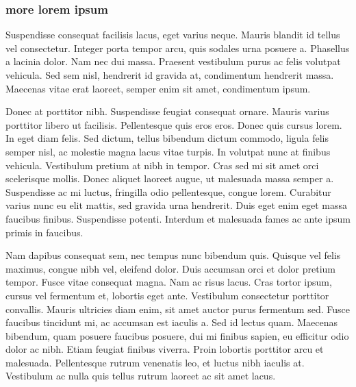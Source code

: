 \documentclass[english]{jamk-report}
\begin{document}
\subsubsection{more lorem ipsum}

Suspendisse consequat facilisis lacus, eget varius neque. Mauris blandit id
tellus vel consectetur. Integer porta tempor arcu, quis sodales urna posuere a.
Phasellus a lacinia dolor. Nam nec dui massa. Praesent vestibulum purus ac
felis volutpat vehicula. Sed sem nisl, hendrerit id gravida at, condimentum
hendrerit massa.  Maecenas vitae erat laoreet, semper enim sit amet,
condimentum ipsum.

Donec at porttitor nibh. Suspendisse feugiat consequat ornare.  Mauris varius
porttitor libero ut facilisis. Pellentesque quis eros eros. Donec quis cursus
lorem. In eget diam felis. Sed dictum, tellus bibendum dictum commodo, ligula
felis semper nisl, ac molestie magna lacus vitae turpis. In volutpat nunc at
finibus vehicula. Vestibulum pretium at nibh in tempor. Cras sed mi sit amet
orci scelerisque mollis. Donec aliquet laoreet augue, ut malesuada massa semper
a. Suspendisse ac mi luctus, fringilla odio pellentesque, congue lorem.
Curabitur varius nunc eu elit mattis, sed gravida urna hendrerit. Duis eget
enim eget massa faucibus finibus. Suspendisse potenti. Interdum et malesuada
fames ac ante ipsum primis in faucibus.

Nam dapibus consequat sem, nec tempus nunc bibendum quis. Quisque vel felis
maximus, congue nibh vel, eleifend dolor. Duis accumsan orci et dolor pretium
tempor. Fusce vitae consequat magna. Nam ac risus lacus. Cras tortor ipsum,
cursus vel fermentum et, lobortis eget ante. Vestibulum consectetur porttitor
convallis. Mauris ultricies diam enim, sit amet auctor purus fermentum sed.
Fusce faucibus tincidunt mi, ac accumsan est iaculis a. Sed id lectus quam.
Maecenas bibendum, quam posuere faucibus posuere, dui mi finibus sapien, eu
efficitur odio dolor ac nibh. Etiam feugiat finibus viverra. Proin lobortis
porttitor arcu et malesuada.  Pellentesque rutrum venenatis leo, et luctus nibh
iaculis at.  Vestibulum ac nulla quis tellus rutrum laoreet ac sit amet lacus.

\end{document}
